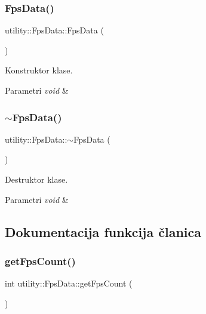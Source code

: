 \subsubsection{\texorpdfstring{Fps\+Data()}{FpsData()}}
{\footnotesize\ttfamily utility\+::\+Fps\+Data\+::\+Fps\+Data (\begin{DoxyParamCaption}{ }\end{DoxyParamCaption})}



Konstruktor klase. 


\begin{DoxyParams}{Parametri}
{\em void} & \\
\hline
\end{DoxyParams}
\mbox{\label{classutility_1_1FpsData_a99d760610ab41e30cf0d1150f60b9332}} 
\subsubsection{\texorpdfstring{$\sim$\+Fps\+Data()}{~FpsData()}}
{\footnotesize\ttfamily utility\+::\+Fps\+Data\+::$\sim$\+Fps\+Data (\begin{DoxyParamCaption}{ }\end{DoxyParamCaption})}



Destruktor klase. 


\begin{DoxyParams}{Parametri}
{\em void} & \\
\hline
\end{DoxyParams}


\subsection{Dokumentacija funkcija članica}
\mbox{\label{classutility_1_1FpsData_abd745ff03d01035ff7a5453558469c2c}} 
\subsubsection{\texorpdfstring{get\+Fps\+Count()}{getFpsCount()}}
{\footnotesize\ttfamily int utility\+::\+Fps\+Data\+::get\+Fps\+Count (\begin{DoxyParamCaption}{ }\end{DoxyParamCaption})}



